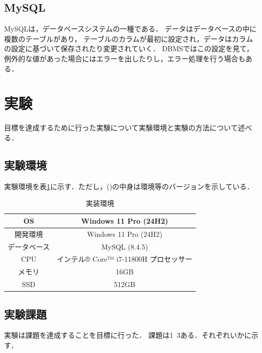 \documentclass[a4paper,11pt]{ltjsarticle}
\begin{document}
\subsection{MySQL}
MySQLは，データベースシステムの一種である．
データはデータベースの中に複数のテーブルがあり，
テーブルのカラムが最初に設定され，データはカラムの設定に基づいて保存されたり変更されていく．
DBMSではこの設定を見て，例外的な値があった場合にはエラーを出したりし，エラー処理を行う場合もある．
\section{実験}
目標を達成するために行った実験について実験環境と実験の方法について述べる．
\subsection{実験環境}
実験環境を表\ref{tab:environment}に示す．ただし，()の中身は環境等のバージョンを示している．
\begin{table}[H]
  \caption{実装環境}
  \centering
  \begin{tabular}{|c|c|}
    \hline
    OS     & Windows 11 Pro (24H2)        \\
    \hline
    開発環境   & Windows 11 Pro (24H2)        \\
    \hline
    データベース & MySQL (8.4.5)                \\
    \hline
    CPU    & インテル® Core™ i7-11800H プロセッサー \\
    \hline
    メモリ    & 16GB                         \\
    \hline
    SSD    & 512GB                        \\
    \hline
  \end{tabular}
  \label{tab:environment}
\end{table}
\subsection{実験課題}
実験は課題を達成することを目標に行った．
課題は1~3ある．それぞれいかに示す．
\end{document}
